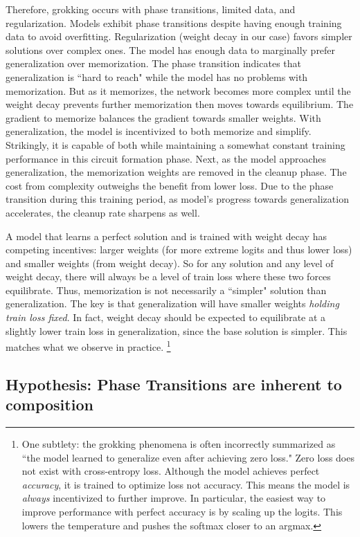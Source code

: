 \documentclass{article} %
\begin{document}
Therefore, grokking occurs with phase transitions, limited data, and regularization. Models exhibit phase transitions despite having enough training data to avoid overfitting. Regularization (weight decay in our case) favors simpler solutions over complex ones. The model has enough data to marginally prefer generalization over memorization. The phase transition indicates that generalization is ``hard to reach" while the model has no problems with memorization. But as it memorizes, the network becomes more complex until the weight decay prevents further memorization then moves towards equilibrium. The gradient to memorize balances the gradient towards smaller weights. With generalization, the model is incentivized to both memorize and simplify. Strikingly, it is capable of both while maintaining a somewhat constant training performance in this circuit formation phase. Next, as the model approaches generalization, the memorization weights are removed in the cleanup phase. The cost from complexity outweighs the benefit from lower loss. Due to the phase transition during this training period, as model's progress towards generalization accelerates, the cleanup rate sharpens as well.

A model that learns a perfect solution and is trained with weight decay has competing incentives: larger weights (for more extreme logits and thus lower loss) and smaller weights (from weight decay). So for any solution and any level of weight decay, there will always be a level of train loss where these two forces equilibrate. Thus, memorization is not necessarily a ``simpler" solution than generalization. The key is that generalization will have smaller weights \emph{holding train loss fixed}. In fact, weight decay should be expected to equilibrate at a slightly lower train loss in generalization, since the base solution is simpler. This matches what we observe in practice. \footnote{One subtlety: the grokking phenomena is often incorrectly summarized as ``the model learned to generalize even after achieving zero loss." Zero loss does not exist with cross-entropy loss. Although the model achieves perfect \emph{accuracy}, it is trained to optimize loss not accuracy. This means the model is \emph{always} incentivized to further improve. In particular, the easiest way to improve performance with perfect accuracy is by scaling up the logits. This lowers the temperature and pushes the softmax closer to an argmax.}


\subsection{Hypothesis: Phase Transitions are inherent to composition}
\end{document}

